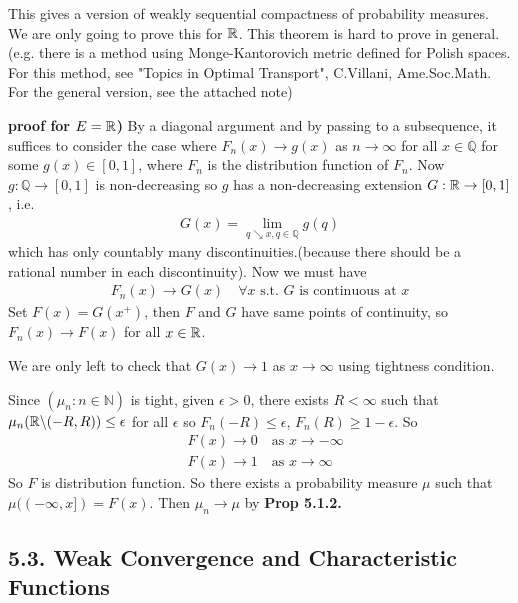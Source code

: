 \documentclass[12pt,a4paper]{report}
\newenvironment{proof}
{\begin{changemargin}{1cm}{0.5cm} 
	}%
	{\end{changemargin}
}
\begin{document}
This gives a version of weakly sequential compactness of probability measures. We are only going to prove this for $\mathbb{R}$. This theorem is hard to prove in general.(e.g. there is a method using Monge-Kantorovich metric defined for Polish spaces. For this method, see "Topics in Optimal Transport", C.Villani, Ame.Soc.Math. For the general version, see the attached note)
\begin{proof}
\textbf{proof for $E=\mathbb{R}$) } By a diagonal argument and by passing to a subsequence, it suffices to consider the case where $F_n(x) \rightarrow g(x)$ as $n\rightarrow \infty$ for all $x\in \mathbb{Q}$ for some $g(x) \in [0,1]$, where $F_n$ is the distribution function of $F_n$. Now $g: \mathbb{Q} \rightarrow [0,1]$ is non-decreasing so $g$ has a non-decreasing extension $G : \mathbb{R} \rightarrow [0,1]$, i.e.
\begin{align*}
G(x) = \lim_{q\searrow x , q\in \mathbb{Q}} g(q)
\end{align*}
which has only countably many discontinuities.(because there should be a rational number in each discontinuity). Now we must have
\begin{align*}
F_n(x) \rightarrow G(x) \quad \forall x \text{ s.t. }G \text{ is continuous at }x
\end{align*}
Set $F(x) = G(x^+)$, then $F$ and $G$ have same points of continuity, so $F_n(x) \rightarrow F(x)$ for all $x\in \mathbb{R}$. 

\quad We are only left to check that $G(x) \rightarrow 1$ as $x\rightarrow \infty$ using tightness condition.

\quad Since $(\mu_n : n\in \mathbb{N})$ is tight, given $\epsilon >0$, there exists $R < \infty$ such that $\mu_n (\mathbb{R} \backslash(-R,R)) \leq\epsilon$ for all $\epsilon$ so $F_n(-R) \leq \epsilon$, $F_n(R) \geq 1-\epsilon$. So
\begin{align*}
& F(x) \rightarrow 0 \quad \text{as } x\rightarrow -\infty \\
& F(x) \rightarrow 1 \quad \text{as } x\rightarrow \infty 
\end{align*}
So $F$ is distribution function. So there exists a probability measure $\mu$ such that $\mu((-\infty,x]) = F(x)$. Then $\mu_n \rightarrow \mu$ by \textbf{Prop 5.1.2.}

\eop
\end{proof}
\s

\subsection*{5.3. Weak Convergence and Characteristic Functions}
\end{document}
